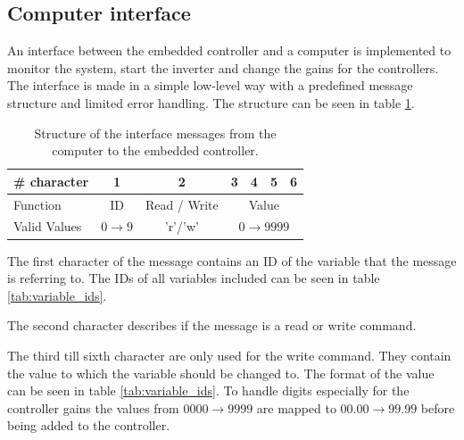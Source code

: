 \subsection{Computer interface}
An interface between the embedded controller and a computer is implemented to monitor the system, start the inverter and change the gains for the controllers. The interface is made in a simple low-level way with a predefined message structure and limited error handling. The structure can be seen in table \ref{tab:message_structure}. 


\begin{table}[H]
\centering
\begin{tabular}{|l|c|c|c|c|c|c|}
\hline
\# character       & 1       & 2                 & 3            & 4            & 5       & 6   \\ \hline
Function      & ID  & Read / Write                     & \multicolumn{4}{c|}{Value}               \\ \hline
Valid Values & $0\rightarrow 9$ & 'r'/'w'  & \multicolumn{4}{c|}{$0\rightarrow 9999$} \\ \hline
\end{tabular}
\caption{Structure of the interface messages from the computer to the embedded controller.}
\label{tab:message_structure}
\end{table}

The first character of the message contains an ID of the variable that the message is referring to. The IDs of all variables included can be seen in table \ref{tab:variable_ids}.

The second character describes if the message is a read or write command.

The third till sixth character are only used for the write command. They contain the value to which the variable should be changed to. The format of the value can be seen in table \ref{tab:variable_ids}. To handle digits especially for the controller gains the values from $0000 \rightarrow 9999$ are mapped to $00.00 \rightarrow 99.99$ before being added to the controller.


